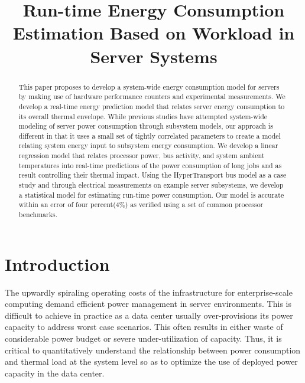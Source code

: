 \documentclass[times, 10pt, finalversion]{usetex-v1}
\begin{document}
\title{Run-time Energy Consumption Estimation Based on Workload in
  Server Systems}
\author{
}

\maketitle
\newtheorem{defn}{Definition}
\newtheorem{thm}{Theorem}
\thispagestyle{empty}

\begin{abstract}
\begin{small}
  This paper proposes to develop a system-wide energy consumption model
  for servers by making use of hardware performance counters and
  experimental measurements. We develop a real-time energy prediction
  model that relates server energy consumption to its overall thermal
  envelope. While previous studies have attempted system-wide modeling
  of server power consumption through subsystem models, our approach is
  different in that it uses a small set of tightly correlated parameters
  to create a model relating system energy input to subsystem energy
  consumption.  We develop a linear regression model that relates
  processor power, bus activity, and system ambient temperatures into
  real-time predictions of the power consumption of long jobs and as
  result controlling their thermal impact.  Using the HyperTransport bus
  model as a case study and through electrical measurements on example
  server subsystems, we develop a statistical model for estimating
  run-time power consumption.  Our model is accurate within an error of
  four percent(4\%) as verified using a set of common processor
  benchmarks.
\end{small}
\end{abstract}

\section{Introduction}
\label{sec:Introduction}
The upwardly spiraling operating costs of the infrastructure for
enterprise-scale computing demand efficient power management in server
environments.  This is difficult to achieve in practice as a data center
usually over-provisions its power capacity to address worst case
scenarios. This often results in either waste of considerable power
budget or severe under-utilization of capacity.  Thus, it is critical to
quantitatively understand the relationship between power consumption and
thermal load at the system level so as to optimize the use of deployed power
capacity in the data center.
\end{document}
